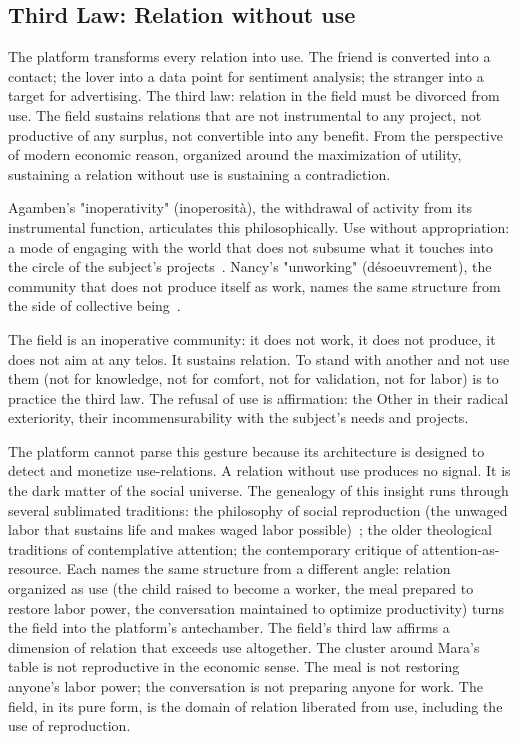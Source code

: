 \subsection{Third Law: Relation without use}

The platform transforms every relation into use. The friend is converted into a contact; the lover into a data point for sentiment analysis; the stranger into a target for advertising. The third law: relation in the field must be divorced from use. The field sustains relations that are not instrumental to any project, not productive of any surplus, not convertible into any benefit. From the perspective of modern economic reason, organized around the maximization of utility, sustaining a relation without use is sustaining a contradiction.

Agamben's "inoperativity" (inoperosità), the withdrawal of activity from its instrumental function, articulates this philosophically. Use without appropriation: a mode of engaging with the world that does not subsume what it touches into the circle of the subject's projects~\cite{agamben2014}. Nancy's "unworking" (désoeuvrement), the community that does not produce itself as work, names the same structure from the side of collective being~\cite{nancy1986}.

The field is an inoperative community: it does not work, it does not produce, it does not aim at any telos. It sustains relation. To stand with another and not use them (not for knowledge, not for comfort, not for validation, not for labor) is to practice the third law. The refusal of use is affirmation: the Other in their radical exteriority, their incommensurability with the subject's needs and projects.

The platform cannot parse this gesture because its architecture is designed to detect and monetize use-relations. A relation without use produces no signal. It is the dark matter of the social universe. The genealogy of this insight runs through several sublimated traditions: the philosophy of social reproduction (the unwaged labor that sustains life and makes waged labor possible)~\cite{federici2004,mies1986}; the older theological traditions of contemplative attention; the contemporary critique of attention-as-resource. Each names the same structure from a different angle: relation organized as use (the child raised to become a worker, the meal prepared to restore labor power, the conversation maintained to optimize productivity) turns the field into the platform's antechamber. The field's third law affirms a dimension of relation that exceeds use altogether. The cluster around Mara's table is not reproductive in the economic sense. The meal is not restoring anyone's labor power; the conversation is not preparing anyone for work. The field, in its pure form, is the domain of relation liberated from use, including the use of reproduction.

